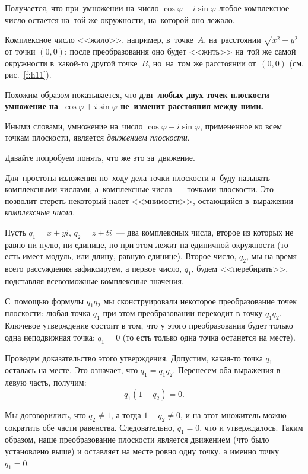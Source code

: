 Получается, что при~умножении на~число $\cos\varphi+i\sin\varphi$ любое комплексное число остается на~той же окружности,
на~которой оно лежало.

Комплексное число <<жило>>, например, в~точке~$A$, на~расстоянии $\sqrt{x^{2}+y^{2}}$ от точки $(0,0)$; после преобразования
оно будет <<жить>> на~той же самой окружности в~какой-то другой точке~$B$, но~на~том же расстоянии
от~$(0,0)$ (см. рис.~\ref{f:h11}).

Похожим образом показывается, что \textbf{для~любых двух точек плоскости умножение на~$\cos\varphi+i\sin\varphi$ не~изменит
расстояния между ними.}

%
%



Иными словами, умножение на~число $\cos\varphi+i\sin\varphi$, примененное ко всем точкам плоскости, является \textit{движением
плоскости}.

Давайте попробуем понять, что же это за~движение.

Для~простоты изложения по~ходу дела точки плоскости я~буду называть комплексными числами,
а~комплексные числа~--- точками плоскости. Это позволит стереть некоторый налет <<мнимости>>,
остающийся в~выражении \textit{комплексные числа}.

Пусть $q_{1}=x+yi$, $q_{2}= z+ti$~--- два комплексных числа, второе из которых не равно ни нулю,
ни единице, но при этом лежит на единичной окружности (то есть имеет модуль, или длину, равную
единице). Второе число, $q_2$, мы на время всего рассуждения зафиксируем, а первое число, $q_1$,
будем <<перебирать>>, подставляя всевозможные комплексные значения.

С~помощью формулы $q_{1}q_{2}$ мы сконструировали некоторое преобразование точек плоскости:
любая точка $q_1$ при этом преобразовании переходит в точку $q_{1}q_{2}$.
 Ключевое утверждение состоит
в том, что у этого преобразования будет только одна неподвижная точка: $q_{1}=0$ (то есть только
одна точка останется на месте).

Проведем доказательство этого утверждения. Допустим, какая-то точка $q_1$ осталась на месте.
Это означает, что $q_1 = q_1 q_2$. Перенесем оба выражения в левую часть, получим:
$$
q_1 (1 - q_2) = 0.
$$

Мы договорились, что $q_2 \neq 1$, а тогда $1 - q_2 \neq 0$, и на этот множитель можно
сократить обе части равенства. Следовательно, $q_1 = 0$, что и утверждалось. Таким
образом, наше преобразование плоскости является движением (что было установлено
выше) и оставляет на месте ровно одну точку, а именно точку $q_1 = 0$.


